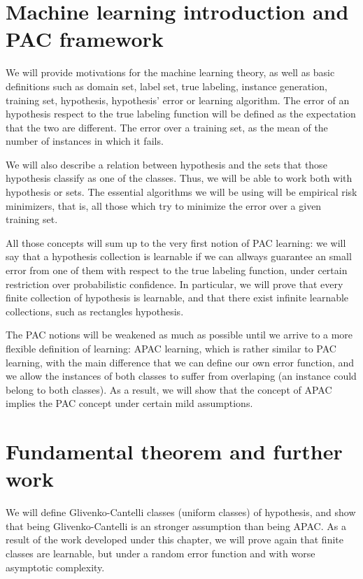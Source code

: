 \section*{Machine learning introduction and PAC framework}
We will provide motivations for the machine learning theory, as well as basic definitions such as domain set, label set, 
true labeling, instance generation, training set, hypothesis, hypothesis' error or learning algorithm. The error of an
hypothesis respect to the true labeling function will be defined as the expectation that the two are different. The error over
a training set, as the mean of the number of instances in which it fails.

We will also describe a relation between hypothesis and the sets that those hypothesis classify as one of the classes. Thus,
we will be able to work both with hypothesis or sets. The essential algorithms we will be using will be empirical risk 
minimizers, that is, all those which try to minimize the error over a given training set.

All those concepts will sum up to the very first notion of PAC learning: we will say that a hypothesis collection is 
learnable if we can allways guarantee an small error from one of them with respect to the true labeling function, under
certain restriction over probabilistic confidence. In particular, we will prove that every finite collection of hypothesis
is learnable, and that there exist infinite learnable collections, such as rectangles hypothesis.

The PAC notions will be weakened as much as possible until we arrive to a more flexible definition of learning: APAC 
learning, which is rather similar to PAC learning, with the main difference that we can define our own error function,
and we allow the instances of both classes to suffer from overlaping (an instance could belong to both classes). As
a result, we will show that the concept of APAC implies the PAC concept under certain mild assumptions.


\section*{Fundamental theorem and further work}

We will define Glivenko-Cantelli classes (uniform classes) of hypothesis, and show that being Glivenko-Cantelli is an
stronger assumption than being APAC. As a result of the work developed under this chapter, we will prove again that finite
classes are learnable, but under a random error function and with worse asymptotic complexity.

